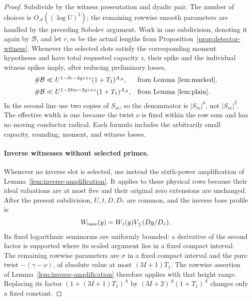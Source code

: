 \documentclass[11pt,a4paper]{article}
\numberwithin{equation}{section}
\numberwithin{figure}{section}
\theoremstyle{definition}
\theoremstyle{remark}
\begin{document}
\begin{proof}
Subdivide by the witness presentation and dyadic pair.  The number
of choices is \(O_{\mathcal A}((\log U)^2)\); the remaining
rowwise smooth parameters are handled by the preceding Sobolev
argument.  Work in one subdivision, denoting it again by
\(\mathcal B\), and let \(r,m\) be the actual lengths
from Proposition~\ref{prop:detector-witness}.  Whenever the selected
slots satisfy the corresponding moment hypotheses and have total
requested capacity \(z\), their spike and the individual witness
spikes imply, after reducing preliminary losses,
\[
 \begin{array}{ll}
 \#\mathcal B
 \ll U^{1-\delta r-2qz+\epsilon}(1+T_1)^{A_{\mathcal A}},
 &\text{from Lemma~\ref{lem:marked}},\\[2mm]
 \#\mathcal B
 \ll U^{1-2\delta m-2qz+\epsilon}(1+T_1)^{A_{\mathcal A}},
 &\text{from Lemma~\ref{lem:plain}}.
 \end{array}
\]
In the second line use two copies of \(S_m\), so the denominator
is \(|S_m|^4\), not \(|S_m|^2\).  The effective width is one
because the twist \(\nu\) is fixed within the row sum and has no
moving conductor radical.  Each formula includes the arbitrarily
small capacity, rounding, moment, and witness losses.

\paragraph{Inverse witnesses without selected primes.}
Whenever no inverse slot is selected, use instead the sixth-power
amplification of Lemma~\ref{lem:inverse-amplification}.  It applies
to these physical rows because their ideal valuations are at most
five and their original zero extensions are unchanged.  After the
present subdivision, \(U,t,D,D_*\) are common, and the inverse base
profile is
\[
 W_{\rm base}(y)=W_1(y)V_{\le}(Dy/D_*).
\]
Its fixed logarithmic seminorms are uniformly bounded: a derivative
of the second factor is supported where its scaled argument lies in
a fixed compact interval.  The remaining rowwise parameters are
\(\sigma\) in a fixed compact interval and the pure twist
\(-(\gamma-\nu)\), of absolute value at most \((3I+1)T_1\).
The rowwise assertion of Lemma~\ref{lem:inverse-amplification}
therefore applies with that height range.  Replacing its factor
\((1+(3I+1)T_1)^A\) by
\((3I+2)^A(1+T_1)^A\) changes only a fixed constant.


\end{proof}
\end{document}
